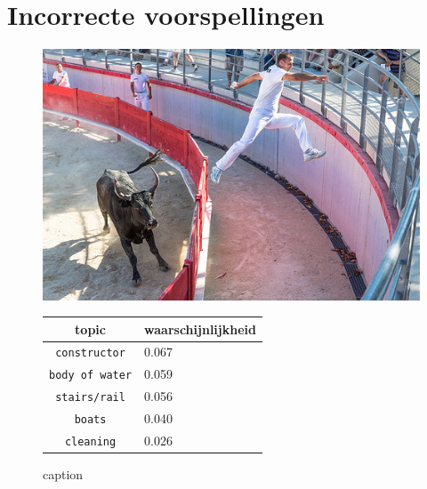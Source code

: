 \section{Incorrecte voorspellingen}
\begin{figure}[h]
    \centering
    \begin{minipage}[t]{.5\linewidth}
    \centering
    \vspace{0pt}
    \includegraphics[width=\textwidth]{Images/LDA/7446693604.jpg}
    \end{minipage}\hfill
    \begin{minipage}[t]{.5\textwidth}
    \centering
    \vspace{0pt}
    \begin{tabular}{cl}
            topic                           & waarschijnlijkheid\\
            \hline
            \texttt{constructor}             & 0.067 \\
            \texttt{body of water}                   & 0.059 \\
            \texttt{stairs/rail}                 & 0.056 \\
            \texttt{boats}           & 0.040 \\
            \texttt{cleaning}        & 0.026\\
            \hline
        \end{tabular}
    \end{minipage}
    \caption{caption}
    \label{fig:label}
\end{figure}
